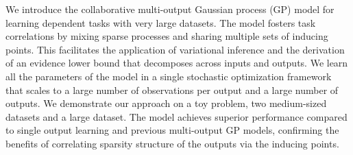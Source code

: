 We introduce the collaborative multi-output Gaussian process (GP) model for learning dependent tasks with very large datasets. 
The model fosters task correlations by mixing sparse processes and sharing multiple sets of inducing points. 
This facilitates  the  application of variational inference and the derivation of 
an evidence lower bound  that decomposes across inputs and outputs. 
We learn all the parameters of the model in a  single stochastic optimization framework
that scales to a large number of observations per output and a large number of outputs.
%
We demonstrate our approach on a toy problem, two medium-sized datasets and a large dataset.
The model achieves superior performance compared to single output learning and previous multi-output GP models, confirming the 
benefits of correlating sparsity structure of the outputs via the inducing points.

